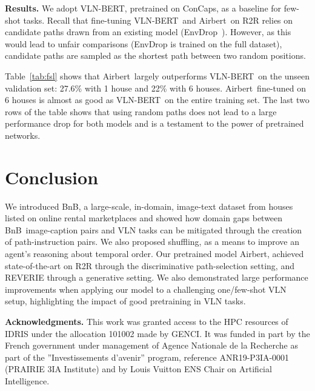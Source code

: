 \RequirePackage[dvipsnames,table]{xcolor} \documentclass[10pt,twocolumn,letterpaper]{article}
\newcommand{\p}[1]{\vspace{1mm}\noindent\textbf{#1}}
\newcommand{\vlnbert}{VLN-BERT}
\newcommand{\airbert}{Airbert}
\newcommand{\airbnb}{BnB}
\begin{document}
\p{Results.}
We adopt \vlnbert, pretrained on ConCaps, as a baseline for few-shot tasks.
Recall that fine-tuning \vlnbert~and \airbert~on R2R relies on candidate paths drawn from an existing model (EnvDrop~\cite{tan2019envdrop}).
However, as this would lead to unfair comparisons (EnvDrop is trained on the full dataset), candidate paths are sampled as the shortest path between two random positions.



Table~\ref{tab:fsl} shows that \airbert~largely outperforms \vlnbert~on the unseen validation set: 27.6\% with 1 house and 22\% with 6 houses.
\airbert~fine-tuned on 6 houses is almost as good as \vlnbert~on the entire training set.
The last two rows of the table shows that using random paths does not lead to a large performance drop for both models and is a testament to the power of pretrained networks.
 \section{Conclusion}
\label{sec:conclusion}
We introduced \airbnb, a large-scale, in-domain, image-text dataset from houses listed on online rental marketplaces and showed how domain gaps between \airbnb~image-caption pairs and VLN tasks can be mitigated through the creation of path-instruction pairs.
We also proposed shuffling, as a means to improve an agent's reasoning about temporal order.
Our pretrained model \airbert, achieved state-of-the-art on R2R through the discriminative path-selection setting, and REVERIE through a generative setting.
We also demonstrated large performance improvements when applying our model to a challenging one/few-shot VLN setup, highlighting the impact of good pretraining in VLN tasks.











 
{\small \noindent\textbf{Acknowledgments.}
This work was granted access to the HPC resources of IDRIS under the allocation 101002 made by GENCI. 
It was funded in part by the French government under management of Agence Nationale de la Recherche as part of the ''Investissements d'avenir'' program, reference ANR19-P3IA-0001 (PRAIRIE 3IA Institute) and by Louis Vuitton ENS Chair on Artificial Intelligence.
}

\balance
{\small


}
\end{document}
